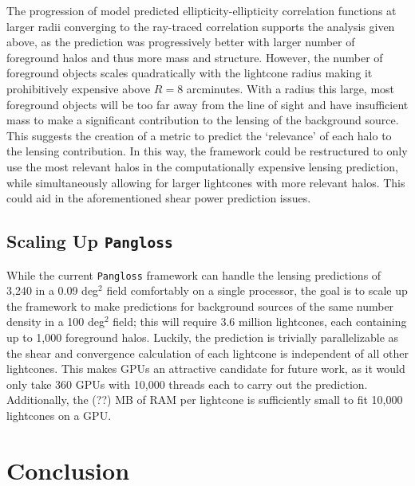\documentclass[%
 reprint,
 amsmath,amssymb,
 aps,nofootinbib
]{revtex4-1}
\begin{document}
The progression of model predicted ellipticity-ellipticity correlation functions at larger radii converging to the ray-traced correlation supports the analysis given above, as the prediction was progressively better with larger number of foreground halos and thus more mass and structure. However, the number of foreground objects scales quadratically with the lightcone radius making it prohibitively expensive above $R=8$ arcminutes. With a radius this large, most foreground objects will be too far away from the line of sight and have insufficient mass to make a significant contribution to the lensing of the background source. This suggests the creation of a metric to predict the `relevance' of each halo to the lensing contribution. In this way, the framework could be restructured to only use the most relevant halos in the computationally expensive lensing prediction, while simultaneously allowing for larger lightcones with more relevant halos. This could aid in the aforementioned shear power prediction issues.  

\subsection*{Scaling Up \texttt{Pangloss}}

While the current \texttt{Pangloss} framework can handle the lensing predictions of 3,240 in a 0.09 deg$^2$ field comfortably on a single processor, the goal is to scale up the framework to make predictions for background sources of the same number density in a 100 deg$^2$ field; this will require 3.6 million lightcones, each containing up to 1,000 foreground halos. Luckily, the prediction is trivially parallelizable as the shear and convergence calculation of each lightcone is independent of all other lightcones. This makes GPUs an attractive candidate for future work, as it would only take 360 GPUs with 10,000 threads each to carry out the prediction. Additionally, the (??) MB of RAM per lightcone is sufficiently small to fit 10,000 lightcones on a GPU.

\section{Conclusion}
\end{document}
